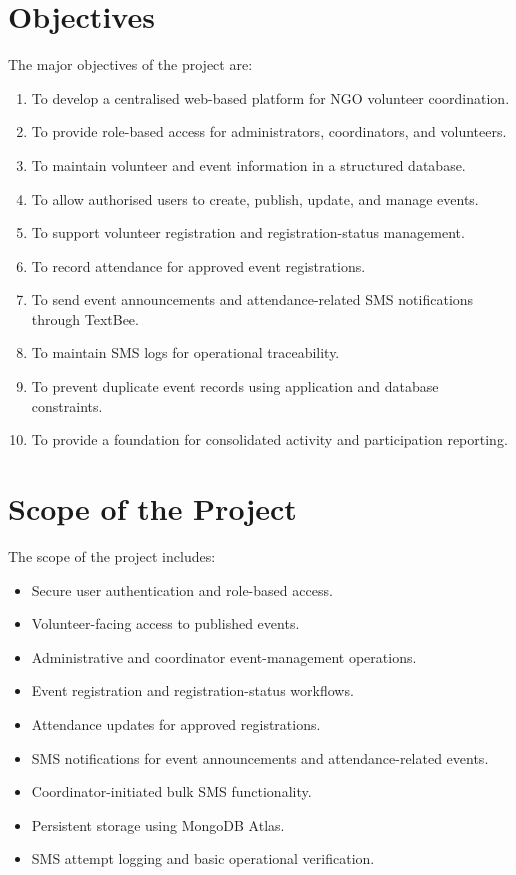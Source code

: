 \documentclass[12pt,a4paper,oneside]{report}
\begin{document}
\section{Objectives}
The major objectives of the project are:
\begin{enumerate}[label=\arabic*.]
  \item To develop a centralised web-based platform for NGO volunteer coordination.
  \item To provide role-based access for administrators, coordinators, and volunteers.
  \item To maintain volunteer and event information in a structured database.
  \item To allow authorised users to create, publish, update, and manage events.
  \item To support volunteer registration and registration-status management.
  \item To record attendance for approved event registrations.
  \item To send event announcements and attendance-related SMS notifications through TextBee.
  \item To maintain SMS logs for operational traceability.
  \item To prevent duplicate event records using application and database constraints.
  \item To provide a foundation for consolidated activity and participation reporting.
\end{enumerate}

\section{Scope of the Project}
The scope of the project includes:
\begin{itemize}
  \item Secure user authentication and role-based access.
  \item Volunteer-facing access to published events.
  \item Administrative and coordinator event-management operations.
  \item Event registration and registration-status workflows.
  \item Attendance updates for approved registrations.
  \item SMS notifications for event announcements and attendance-related events.
  \item Coordinator-initiated bulk SMS functionality.
  \item Persistent storage using MongoDB Atlas.
  \item SMS attempt logging and basic operational verification.
\end{itemize}
\end{document}
